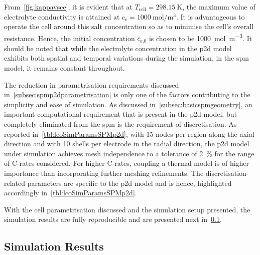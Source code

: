 From~\cref{fig:kappavsce},       it        is       evident        that       at
$T_\text{cell}=\SI{298.15}{\kelvin}$,   the   maximum   value   of   electrolyte
conductivity is attained at  $c_\text{e} = \SI{1000}{\mole\per\meter\cubed}$. It
is advantageous  to operate  the cell  around this salt  concentration so  as to
minimise  the  cell's  overall  resistance.  Hence,  the  initial  concentration
$c_\text{e,0}$ is  chosen to  be \SI{1000}{\mole\per\meter\cubed}. It  should be
noted that while  the electrolyte concentration in the  \gls{p2d} model exhibits
both spatial  and temporal  variations during the  simulation, in  the \gls{spm}
model, it remains constant throughout.

The      reduction      in      parametrisation      requirements      discussed
in~\cref{subsec:spmp2dparametrisation}    is   only    one   of    the   factors
contributing  to   the  simplicity   and  ease   of  simulation.   As  discussed
in~\cref{subsec:basicspmgeometry},   an   important  computational   requirement
that   is  present   in   the  \gls{p2d}   model,   but  completely   eliminated
from  the   \gls{spm}  is  the   requirement  of  discretisation.   As  reported
in~\cref{tbl:lcoSimParamsSPMp2d},  with  15 nodes  per  region  along the  axial
direction  and  with 10  shells  per  electrode  in  the radial  direction,  the
\gls{p2d}  model under  simulation  achieves mesh  independence  to a  tolerance
of  \approx   \SI{2}{\percent}  for  the   range  of  C-rates   considered.  For
higher  C-rates,  coupling  a  thermal   model  is  of  higher  importance  than
incorporating further meshing refinements. The discretisation-related parameters
are  specific to  the  \gls{p2d}  model and  is  hence, highlighted  accordingly
in~\cref{tbl:lcoSimParamsSPMp2d}.

With  the cell  parametrisation discussed  and the  simulation setup  presented,
the  simulation   results  are  fully   reproducible  and  are   presented  next
in~\cref{subsec:simresultsbasicspm}.

\subsection{Simulation Results}\label{subsec:simresultsbasicspm}

